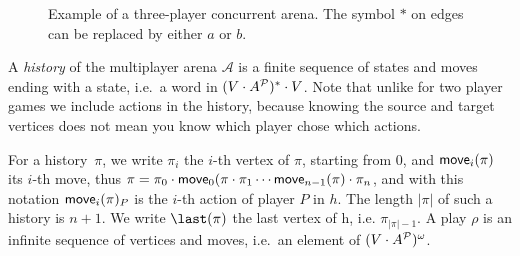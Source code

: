 \begin{figure}
  \begin{center}
  \end{center}
    \caption{Example of a three-player concurrent arena. The symbol $\ast$ on edges can be replaced by either $a$ or $b$.}
    \label{13-fig:example1}
\end{figure}


A \emph{history} of the multiplayer arena
\({\mathcal A}\) is a finite sequence of states and moves ending with a
state, i.e.~a word in \((V \cdot A^{\mathcal{P}})^* \cdot V\). Note that unlike
for two player games we include actions in the history, because knowing
the source and target vertices does not mean you know which player chose
which actions.

For a history~$\pi$, we write \(\pi_i\) the $i$-th vertex of $\pi$, starting from $0$, and
\(\textsf{move}_i(\pi)\) its $i$-th move, thus
\(\pi = \pi_0 \cdot \textsf{move}_0(\pi \cdot \pi_1 \cdots \textsf{move}_{n-1}(\pi)\cdot \pi_n\), and
with this notation $\textsf{move}_i(\pi)_P$ is the $i$-th action of player $P$ in $h$.
The length $|\pi|$ of such a history is $n + 1$. We write
$\last(\pi)$ the last vertex of h, i.e. \(\pi_{|\pi|-1}\).
A play \(\rho\) is an
infinite sequence of vertices and moves, i.e.~an element of
\((V \cdot A^{\mathcal{P}})^\omega\).


